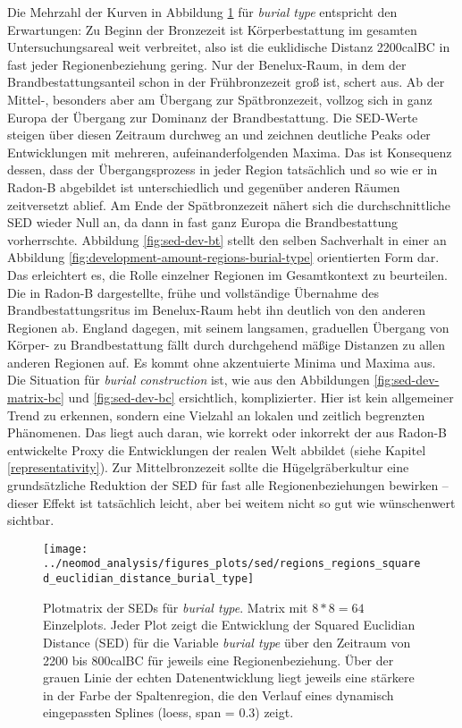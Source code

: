 \documentclass[openany,twoside,twocolumn]{book}
\begin{document}
Die Mehrzahl der Kurven in Abbildung \ref{fig:sed-dev-matrix-bt} für \emph{burial type} entspricht den Erwartungen: Zu Beginn der Bronzezeit ist Körperbestattung im gesamten Untersuchungsareal weit verbreitet, also ist die euklidische Distanz 2200calBC in fast jeder Regionenbeziehung gering. Nur der Benelux-Raum, in dem der Brandbestattungsanteil schon in der Frühbronzezeit groß ist, schert aus. Ab der Mittel-, besonders aber am Übergang zur Spätbronzezeit, vollzog sich in ganz Europa der Übergang zur Dominanz der Brandbestattung. Die SED-Werte steigen über diesen Zeitraum durchweg an und zeichnen deutliche Peaks oder Entwicklungen mit mehreren, aufeinanderfolgenden Maxima. Das ist Konsequenz dessen, dass der Übergangsprozess in jeder Region tatsächlich und so wie er in Radon-B abgebildet ist unterschiedlich und gegenüber anderen Räumen zeitversetzt ablief. Am Ende der Spätbronzezeit nähert sich die durchschnittliche SED wieder Null an, da dann in fast ganz Europa die Brandbestattung vorherrschte. Abbildung \ref{fig:sed-dev-bt} stellt den selben Sachverhalt in einer an Abbildung \ref{fig:development-amount-regions-burial-type} orientierten Form dar. Das erleichtert es, die Rolle einzelner Regionen im Gesamtkontext zu beurteilen. Die in Radon-B dargestellte, frühe und vollständige Übernahme des Brandbestattungsritus im Benelux-Raum hebt ihn deutlich von den anderen Regionen ab. England dagegen, mit seinem langsamen, graduellen Übergang von Körper- zu Brandbestattung fällt durch durchgehend mäßige Distanzen zu allen anderen Regionen auf. Es kommt ohne akzentuierte Minima und Maxima aus. Die Situation für \emph{burial construction} ist, wie aus den Abbildungen \ref{fig:sed-dev-matrix-bc} und \ref{fig:sed-dev-bc} ersichtlich, komplizierter. Hier ist kein allgemeiner Trend zu erkennen, sondern eine Vielzahl an lokalen und zeitlich begrenzten Phänomenen. Das liegt auch daran, wie korrekt oder inkorrekt der aus Radon-B entwickelte Proxy die Entwicklungen der realen Welt abbildet (siehe Kapitel \ref{representativity}). Zur Mittelbronzezeit sollte die Hügelgräberkultur eine grundsätzliche Reduktion der SED für fast alle Regionenbeziehungen bewirken -- dieser Effekt ist tatsächlich leicht, aber bei weitem nicht so gut wie wünschenwert sichtbar.

\begin{figure}
\texttt{[image: ../neomod\_analysis/figures\_plots/sed/regions\_regions\_squared\_euclidian\_distance\_burial\_type]} \caption[Plotmatrix der SEDs für \textit{burial type}]{Plotmatrix der SEDs für \textit{burial type}. Matrix mit $8*8=64$ Einzelplots. Jeder Plot zeigt die Entwicklung der Squared Euclidian Distance (SED) für die Variable \textit{burial type} über den Zeitraum von 2200 bis 800calBC für jeweils eine Regionenbeziehung. Über der grauen Linie der echten Datenentwicklung liegt jeweils eine stärkere in der Farbe der Spaltenregion, die den Verlauf eines dynamisch eingepassten Splines (loess, span = 0.3) zeigt.}\label{fig:sed-dev-matrix-bt}
\end{figure}
\end{document}
